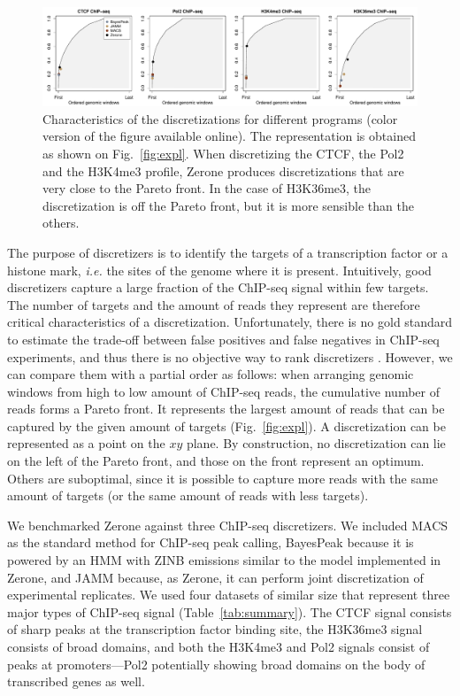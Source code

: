 \documentclass{bioinfo}
\begin{document}
\begin{figure}[!tbp]
\centerline{\includegraphics[scale=0.4]{pareto_front.pdf}}
\caption{
  Characteristics of the discretizations for different programs
  (color version of the figure available online).
  The representation is obtained as shown on Fig.~\ref{fig:expl}.
  When discretizing the CTCF, the Pol2 and the H3K4me3 profile,
  Zerone produces discretizations that are very close to the Pareto
  front. In the case of H3K36me3, the discretization is off the
  Pareto front, but it is more sensible than the others.
}
\label{fig:pareto}
\end{figure}

The purpose of discretizers is to identify the targets of a
transcription factor or a histone mark, \textit{i.e.} the sites of
the genome where it is present.
Intuitively, good discretizers capture a large fraction of the
ChIP-seq signal within few targets. The number of targets
and the amount of reads they represent are therefore critical
characteristics of a discretization. Unfortunately, there is no gold
standard to estimate the trade-off between false positives and false
negatives in ChIP-seq experiments, and thus there is no objective way
to rank discretizers \citep{pmid21059603}. However, we can compare
them with a partial order as follows: when arranging genomic
windows from high to low amount of ChIP-seq
reads, the cumulative number of reads forms a Pareto front.
It represents the largest amount of reads that can be captured by the
given amount of targets (Fig.~\ref{fig:expl}). A discretization can
be represented as a point on the $xy$ plane.  By construction, no
discretization can lie on the left of the Pareto front, and those on
the front represent an optimum. Others are suboptimal, since it is
possible to capture more reads with the same amount of targets
(or the same amount of reads with less targets).

We benchmarked Zerone against three ChIP-seq discretizers.
We included MACS as the standard method for ChIP-seq peak calling,
BayesPeak because it is powered by an HMM with ZINB emissions
similar to the model implemented in Zerone, and JAMM because, as
Zerone, it can perform joint discretization of experimental replicates.
We used four datasets of similar size that represent three major
types of ChIP-seq signal (Table~\ref{tab:summary}). The CTCF
signal consists of sharp
peaks at the transcription factor binding site, the H3K36me3 signal
consists of broad domains, and both the H3K4me3 and Pol2 signals consist
of peaks at promoters---Pol2 potentially showing broad domains on the
body of transcribed genes as well.
\end{document}
